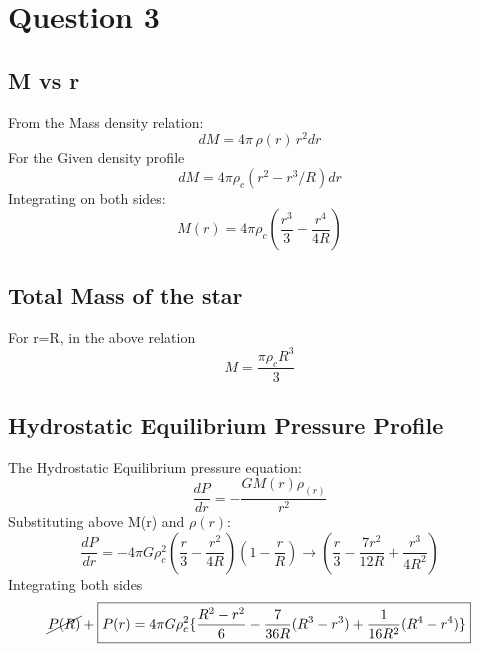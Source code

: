 \documentclass[11pt]{article}
\begin{document}
	\section{\color{teal} Question 3}
	
	\subsection{M vs r}
	
	From the Mass density relation:
	\[
		dM = 4\pi \, \rho(r)\,  r^2 dr
	\]
	For the Given density profile
	\[
		dM =4\pi\rho_c(r^2 - r^3/R)dr
	\]
	Integrating on both sides:
	\[
		\boxed{M(r) = 4\pi\rho_c (\frac{r^3}{3} -\frac{r^4}{4R})}
	\]
	\subsection{Total Mass of the star}
	
	For r=R, in the above relation
	\[
		\boxed{M = \frac{\pi\rho_cR^3}{3}}
	\]
	\subsection{Hydrostatic Equilibrium Pressure Profile}
	
	The Hydrostatic Equilibrium pressure equation:
	\[
		\frac{dP}{dr}  = -\frac{GM(r)\rho_(r)}{r^2}
	\]
	Substituting above M(r) and $\rho(r)$:
	\[
		\frac{dP}{dr} = -4\pi G \rho_c^2 (\frac{r}{3} - \frac{r^2}{4R})(1-\frac{r}{R}) \rightarrow (\frac{r}{3} -\frac{7r^2}{12R} + \frac{r^3}{4R^2})
	\]
	Integrating both sides
	\[
		\cancel{P(R)} + \boxed{P(r) = 4\pi G \rho_c^2 \{\frac{R^2-r^2}{6} - \frac{7}{36R}(R^3-r^3) + \frac{1}{16R^2}(R^4-r^4)\}}
	\]
	
\end{document}
